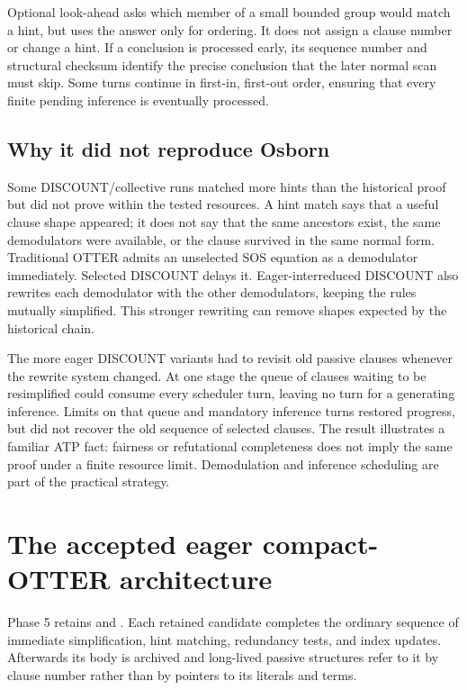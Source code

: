 \documentclass[11pt]{article}
\newcommand{\setting}[1]{\texttt{\detokenize{#1}}}
\begin{document}
Optional look-ahead asks which member of a small bounded group would match a
hint, but uses the answer only for ordering.  It does not assign a clause number
or change a hint.  If a conclusion is processed early, its sequence number and
structural checksum identify the precise conclusion that the later normal scan
must skip.  Some turns continue in first-in, first-out order, ensuring that
every finite pending inference is eventually processed.

\subsection{Why it did not reproduce Osborn}

Some DISCOUNT/collective runs matched more hints than the historical proof but
did not prove within the tested resources.  A hint match says that a useful
clause shape appeared; it does not say that the same ancestors exist, the same
demodulators were available, or the clause survived in the same normal form.
Traditional OTTER admits an unselected SOS equation as a demodulator
immediately.  Selected DISCOUNT delays it.  Eager-interreduced DISCOUNT also
rewrites each demodulator with the other demodulators, keeping the rules
mutually simplified.  This stronger rewriting can remove shapes expected by
the historical chain.

The more eager DISCOUNT variants had to revisit old passive clauses whenever
the rewrite system changed.  At one stage the queue of clauses waiting to be
resimplified could consume every scheduler turn, leaving no turn for a
generating inference.  Limits on that queue and mandatory inference turns
restored progress, but did
not recover the old sequence of selected clauses.  The result illustrates a
familiar ATP fact: fairness or refutational completeness does not imply the same
proof under a finite resource limit.  Demodulation and inference scheduling are
part of the practical strategy.

\section{The accepted eager compact-OTTER architecture}

Phase 5 retains \setting{search_loop=otter} and
\setting{inference_frontier=clauses}.  Each retained candidate completes the
ordinary sequence of immediate simplification, hint matching, redundancy
tests, and index updates.  Afterwards its body is archived and long-lived
passive structures refer to it by clause number rather than by pointers to its
literals and terms.
\end{document}
